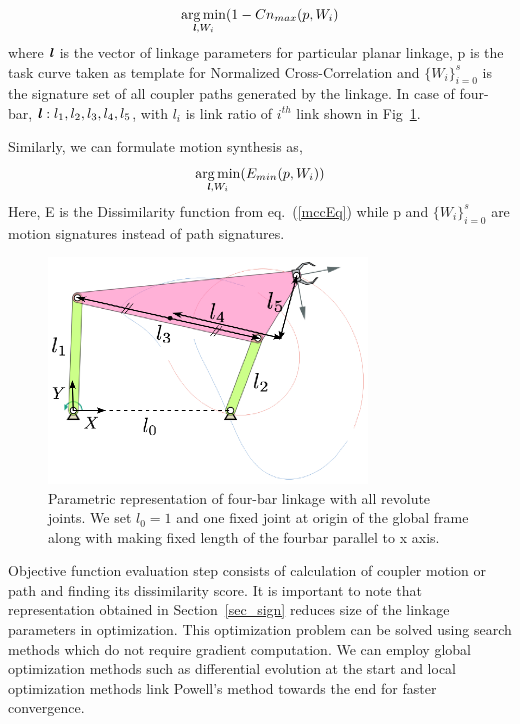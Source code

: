 \documentclass[twocolumn,10pt]{asme2e}
\newcommand{\req}[1]{(\ref{#1})}
\DeclareMathOperator*{\argminA}{arg\,min}
\begin{document}
\begin{equation}\label{objectiveFunPath}
  \argminA_{\textbf{\emph{l}}, W_i} (1 - Cn_{max}(p, W_i)
\end{equation}
where $\textbf{\emph{l}}$ is the vector of linkage parameters for particular planar linkage, p is the task curve taken as template for Normalized Cross-Correlation and ${\{W_i\}}_{i=0}^{s}$ is the signature set of all coupler paths generated by the linkage.
In case of four-bar, $\textbf{\emph{l}}: l_1, l_2, l_3, l_4, l_5$, with $l_i$ is link ratio of $i^{th}$ link shown in Fig~\ref{fourbar}.

Similarly, we can formulate motion synthesis as,
\begin{equation}\label{objectiveFunMotion}
  \argminA_{\textbf{\emph{l}}, W_i} (E_{min}(p, W_i))
\end{equation}
Here, E is the Dissimilarity function from eq.~\req{mccEq} while p and ${\{W_i\}}_{i=0}^{s}$ are motion signatures instead of path signatures.

\begin{figure}
\centering
\includegraphics[width=240pt]{figure/fig_fourbar.eps}
  \caption{Parametric representation of four-bar linkage with all revolute joints. We set $l_0 = 1$ and one fixed joint at origin of the global frame along with making fixed length of the fourbar parallel to x axis.}
\label{fourbar}
\end{figure}

Objective function evaluation step consists of calculation of coupler motion or path and finding its dissimilarity score.
It is important to note that representation obtained in Section~\ref{sec_sign} reduces size of the linkage parameters in optimization.
This optimization problem can be solved using search methods which do not require gradient computation.
We can employ global optimization methods such as differential evolution at the start and local optimization methods link Powell's method towards the end for faster convergence\cite{ullah1997}.
\end{document}
